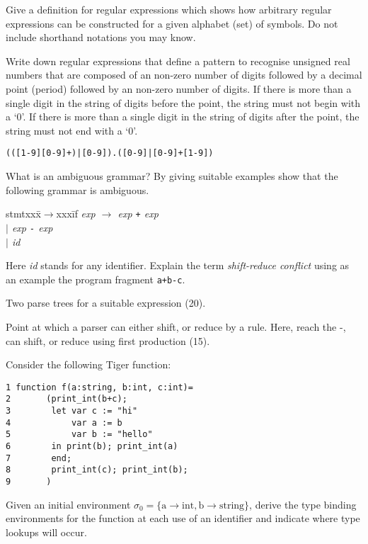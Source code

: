 \documentclass[11pt]{cityexam}
\begin{document}
\begin{questions}

\newpage

\question

\begin{subquestions}


\subquestion
Give a definition for regular expressions which shows how
arbitrary regular expressions can be constructed for a
given alphabet (set) of symbols. Do not include shorthand
notations you may know.

\subquestion
Write down regular expressions that define a pattern to recognise
unsigned real numbers that are composed of an non-zero number of digits
followed by a decimal point (period) followed by an non-zero number of
digits. If there is more than a single digit in the string of 
digits before the point, the string must not begin with a `0'. 
If there is more than a single digit in the string of digits after the point, 
the string must not end with a `0'.

\begin{modelanswer}
\begin{verbatim}
(([1-9][0-9]+)|[0-9]).([0-9]|[0-9]+[1-9])
\end{verbatim}
\end{modelanswer}

\subquestion
What is an ambiguous grammar? 
By giving suitable examples show that the
        following grammar is ambiguous. 
\begin{tabbing}
stmtxxx\=$\rightarrow$xxx\=if\kill
\it
exp \> $\rightarrow$ \> {\it exp\/} \verb!+! {\it exp} \\
\it
     \> $\mid$ \> {\it exp\/} \verb!-! {\it exp\/} \\
     \> $\mid$ \> {\it id}
\end{tabbing}
Here {\it id\/} stands for any identifier.
Explain the term {\em shift-reduce conflict\/} using as
an example the program fragment \verb!a+b-c!.

\begin{modelanswer}
Two parse trees for a suitable expression (20).

Point at which a parser can either shift, or reduce by a rule. 
Here, reach the -, can shift, or reduce using first production (15).
\end{modelanswer}


\subquestion
Consider the following Tiger function:
\begin{verbatim}
1 function f(a:string, b:int, c:int)=
2       (print_int(b+c);
3        let var c := "hi"
4            var a := b
5            var b := "hello"
6        in print(b); print_int(a) 
7        end;
8        print_int(c); print_int(b);
9       )
\end{verbatim}
Given an initial environment $\sigma_0 = \{\textrm{a} \rightarrow \textrm{int}, \textrm{b} \rightarrow \textrm{string}\}$, derive the type binding environments for the function at each
use of an identifier and indicate where type lookups will occur.


\end{subquestions}
\end{questions}
\end{document}

